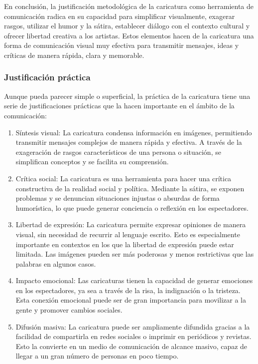 \documentclass[12pt,a4paper]{article}
\begin{document}
En conclusión, la justificación metodológica de la caricatura como herramienta de comunicación radica en su capacidad para simplificar visualmente, exagerar rasgos, utilizar el humor y la sátira, establecer diálogo con el contexto cultural y ofrecer libertad creativa a los artistas. Estos elementos hacen de la caricatura una forma de comunicación visual muy efectiva para transmitir mensajes, ideas y críticas de manera rápida, clara y memorable.


\subsubsection{Justificación práctica}
Aunque pueda parecer simple o superficial, la práctica de la caricatura tiene una serie de justificaciones prácticas que la hacen importante en el ámbito de la comunicación:

\begin{enumerate}
	\item  Síntesis visual: La caricatura condensa información en imágenes, permitiendo transmitir mensajes complejos de manera rápida y efectiva. A través de la exageración de rasgos característicos de una persona o situación, se simplifican conceptos y se facilita su comprensión.
	\item  Crítica social: La caricatura es una herramienta para hacer una crítica constructiva de la realidad social y política. Mediante la sátira, se exponen problemas y se denuncian situaciones injustas o absurdas de forma humorística, lo que puede generar conciencia o reflexión en los espectadores.
	\item  Libertad de expresión: La caricatura permite expresar opiniones de manera visual, sin necesidad de recurrir al lenguaje escrito. Esto es especialmente importante en contextos en los que la libertad de expresión puede estar limitada. Las imágenes pueden ser más poderosas y menos restrictivas que las palabras en algunos casos.
	\item  Impacto emocional: Las caricaturas tienen la capacidad de generar emociones en los espectadores, ya sea a través de la risa, la indignación o la tristeza. Esta conexión emocional puede ser de gran importancia para movilizar a la gente y promover cambios sociales.
	\item  Difusión masiva: La caricatura puede ser ampliamente difundida gracias a la facilidad de compartirla en redes sociales o imprimir en periódicos y revistas. Esto la convierte en un medio de comunicación de alcance masivo, capaz de llegar a un gran número de personas en poco tiempo.
\end{enumerate}
\end{document}
